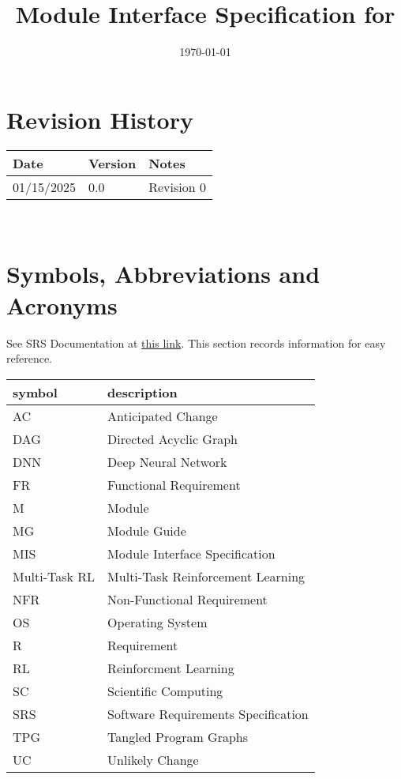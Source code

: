 \documentclass[12pt, titlepage]{article}
\begin{document}
\title{Module Interface Specification for \progname{}}

\author{\authname}

\date{\today}

\maketitle


\section{Revision History}

\begin{tabularx}{\textwidth}{p{3cm}p{2cm}X}
\toprule {\bf Date} & {\bf Version} & {\bf Notes}\\
\midrule
01/15/2025 & 0.0 & Revision 0\\
\bottomrule
\end{tabularx}

~\newpage

\section{Symbols, Abbreviations and Acronyms}

See SRS Documentation at \href{https://github.com/TPGEngine/tpg/blob/main/docs/SRS/SRS.pdf}{this link}. This section records information for easy reference. \\

\renewcommand{\arraystretch}{1.2}
\begin{tabular}{l l} 
  \toprule		
  \textbf{symbol} & \textbf{description}\\
  \midrule 
  AC & Anticipated Change\\
  DAG & Directed Acyclic Graph \\
  DNN & Deep Neural Network \\
  FR & Functional Requirement \\
  M & Module \\
  MG & Module Guide \\
  MIS & Module Interface Specification \\
  Multi-Task RL & Multi-Task Reinforcement Learning \\
  NFR & Non-Functional Requirement \\
  OS & Operating System \\
  R & Requirement\\
  RL & Reinforcment Learning \\
  SC & Scientific Computing \\
  SRS & Software Requirements Specification \\
  TPG & Tangled Program Graphs\\
  UC & Unlikely Change \\
  \bottomrule
\end{tabular}\\
\end{document}
